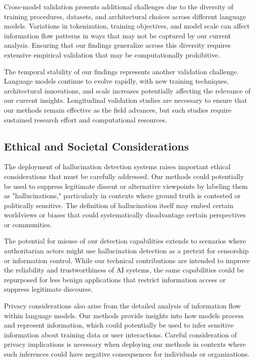 Cross-model validation presents additional challenges due to the diversity of training procedures, datasets, and architectural choices across different language models. Variations in tokenization, training objectives, and model scale can affect information flow patterns in ways that may not be captured by our current analysis. Ensuring that our findings generalize across this diversity requires extensive empirical validation that may be computationally prohibitive.

The temporal stability of our findings represents another validation challenge. Language models continue to evolve rapidly, with new training techniques, architectural innovations, and scale increases potentially affecting the relevance of our current insights. Longitudinal validation studies are necessary to ensure that our methods remain effective as the field advances, but such studies require sustained research effort and computational resources.

\subsection{Ethical and Societal Considerations}

The deployment of hallucination detection systems raises important ethical considerations that must be carefully addressed. Our methods could potentially be used to suppress legitimate dissent or alternative viewpoints by labeling them as "hallucinations," particularly in contexts where ground truth is contested or politically sensitive. The definition of hallucination itself may embed certain worldviews or biases that could systematically disadvantage certain perspectives or communities.

The potential for misuse of our detection capabilities extends to scenarios where authoritarian actors might use hallucination detection as a pretext for censorship or information control. While our technical contributions are intended to improve the reliability and trustworthiness of AI systems, the same capabilities could be repurposed for less benign applications that restrict information access or suppress legitimate discourse.

Privacy considerations also arise from the detailed analysis of information flow within language models. Our methods provide insights into how models process and represent information, which could potentially be used to infer sensitive information about training data or user interactions. Careful consideration of privacy implications is necessary when deploying our methods in contexts where such inferences could have negative consequences for individuals or organizations.



